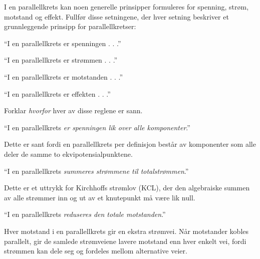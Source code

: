 

I en parallellkrets kan noen generelle prinsipper formuleres for spenning, strøm, motstand og effekt. Fullfør disse setningene, der hver setning beskriver et grunnleggende prinsipp for parallellkretser:

\vskip 10pt

\noindent
``I en parallellkrets er spenningen . . .''

\vskip 10pt

\noindent
``I en parallellkrets er strømmen . . .''

\vskip 10pt

\noindent
``I en parallellkrets er motstanden . . .''

\vskip 10pt

\noindent
``I en parallellkrets er effekten . . .''

\vskip 10pt

Forklar {\it hvorfor} hver av disse reglene er sann.







\noindent
``I en parallellkrets {\it er spenningen lik over alle komponenter}.''

\vskip 10pt

Dette er sant fordi en parallellkrets per definisjon består av komponenter som alle deler de samme to ekvipotensialpunktene.




\vskip 30pt

\noindent
``I en parallellkrets {\it summeres strømmene til totalstrømmen}.''

\vskip 10pt

Dette er et uttrykk for Kirchhoffs strømlov (KCL), der den algebraiske summen av alle strømmer inn og ut av et knutepunkt må være lik null.



\vskip 30pt

\noindent
``I en parallellkrets {\it reduseres den totale motstanden}.''

\vskip 10pt

Hver motstand i en parallellkrets gir en ekstra strømvei.  Når motstander kobles parallelt, gir de samlede strømveiene lavere motstand enn hver enkelt vei, fordi strømmen kan dele seg og fordeles mellom alternative veier.



